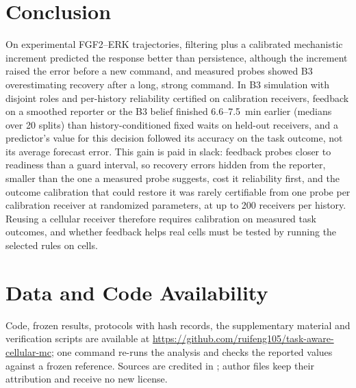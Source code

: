 \documentclass[conference]{IEEEtran}
\begin{document}
\section{Conclusion}
On experimental FGF2--ERK trajectories, filtering plus a calibrated mechanistic increment predicted the response better than persistence, although the increment raised the error before a new command, and measured probes showed B3 overestimating recovery after a long, strong command. In B3 simulation with disjoint roles and per-history reliability certified on calibration receivers, feedback on a smoothed reporter or the B3 belief finished 6.6--7.5~min earlier (medians over 20 splits) than history-conditioned fixed waits on held-out receivers, and a predictor's value for this decision followed its accuracy on the task outcome, not its average forecast error. This gain is paid in slack: feedback probes closer to readiness than a guard interval, so recovery errors hidden from the reporter, smaller than the one a measured probe suggests, cost it reliability first, and the outcome calibration that could restore it was rarely certifiable from one probe per calibration receiver at randomized parameters, at up to 200 receivers per history. Reusing a cellular receiver therefore requires calibration on measured task outcomes, and whether feedback helps real cells must be tested by running the selected rules on cells.
  
\section*{Data and Code Availability}
Code, frozen results, protocols with hash records, the supplementary material and verification scripts are available at \url{https://github.com/ruifeng105/task-aware-cellular-mc}; one command re-runs the analysis and checks the reported values against a frozen reference. Sources are credited in \cite{blum2019,lfnsrepo,mendeley2020}; author files keep their attribution and receive no new license.

  

\end{document}
